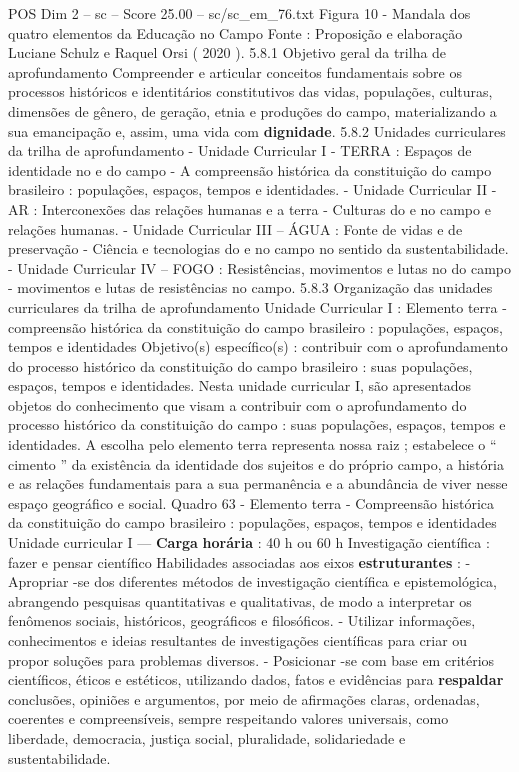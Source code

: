 \begin{textsample}{POS Dim 2 – sc – Score 25.00 – sc/sc\_em\_76.txt}
Figura 10 - Mandala dos quatro elementos da Educação no Campo Fonte : Proposição e elaboração Luciane Schulz e Raquel Orsi ( 2020 ). 5.8.1 Objetivo geral da trilha de aprofundamento Compreender e articular conceitos fundamentais sobre os processos históricos e identitários constitutivos das vidas, populações, culturas, dimensões de gênero, de geração, etnia e produções do campo, materializando a sua emancipação e, assim, uma vida com \textbf{dignidade}. 5.8.2 Unidades curriculares da trilha de aprofundamento - Unidade Curricular I - TERRA : Espaços de identidade no e do campo - A compreensão histórica da constituição do campo brasileiro : populações, espaços, tempos e identidades. - Unidade Curricular II - AR : Interconexões das relações humanas e a terra - Culturas do e no campo e relações humanas. - Unidade Curricular III – ÁGUA : Fonte de vidas e de preservação - Ciência e tecnologias do e no campo no sentido da sustentabilidade. - Unidade Curricular IV – FOGO : Resistências, movimentos e lutas no do campo - movimentos e lutas de resistências no campo. 5.8.3 Organização das unidades curriculares da trilha de aprofundamento Unidade Curricular I : Elemento terra - compreensão histórica da constituição do campo brasileiro : populações, espaços, tempos e identidades Objetivo(s) específico(s) : contribuir com o aprofundamento do processo histórico da constituição do campo brasileiro : suas populações, espaços, tempos e identidades.
Nesta unidade curricular I, são apresentados objetos do conhecimento que visam a contribuir com o aprofundamento do processo histórico da constituição do campo : suas populações, espaços, tempos e identidades.
A escolha pelo elemento terra representa nossa raiz ; estabelece o “ cimento ” da existência da identidade dos sujeitos e do próprio campo, a história e as relações fundamentais para a sua permanência e a abundância de viver nesse espaço geográfico e social.
Quadro 63 - Elemento terra - Compreensão histórica da constituição do campo brasileiro : populações, espaços, tempos e identidades Unidade curricular I — \textbf{Carga} \textbf{horária} : 40 h ou 60 h Investigação científica : fazer e pensar científico Habilidades associadas aos eixos \textbf{estruturantes} : - Apropriar -se dos diferentes métodos de investigação científica e epistemológica, abrangendo pesquisas quantitativas e qualitativas, de modo a interpretar os fenômenos sociais, históricos, geográficos e filosóficos. - Utilizar informações, conhecimentos e ideias resultantes de investigações científicas para criar ou propor soluções para problemas diversos. - Posicionar -se com base em critérios científicos, éticos e estéticos, utilizando dados, fatos e evidências para \textbf{respaldar} conclusões, opiniões e argumentos, por meio de afirmações claras, ordenadas, coerentes e compreensíveis, sempre respeitando valores universais, como liberdade, democracia, justiça social, pluralidade, solidariedade e sustentabilidade.

\end{textsample}
